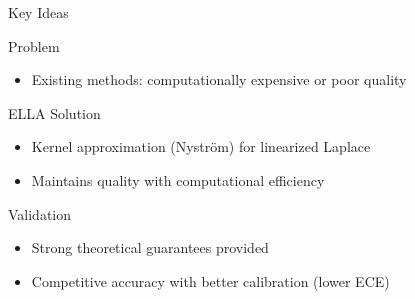 \documentclass{beamer}
\begin{document}
\begin{frame}{Key Ideas}

\begin{block}{Problem}
\begin{itemize}
    \item Existing methods: computationally expensive or poor quality
\end{itemize}
\end{block}

\begin{block}{ELLA Solution}
\begin{itemize}
    \item Kernel approximation (Nyström) for linearized Laplace
    \item Maintains quality with computational efficiency
\end{itemize}
\end{block}

\begin{block}{Validation}
\begin{itemize}
    \item Strong theoretical guarantees provided
    \item Competitive accuracy with better calibration (lower ECE)
\end{itemize}
\end{block}

\end{frame}
\end{document}
